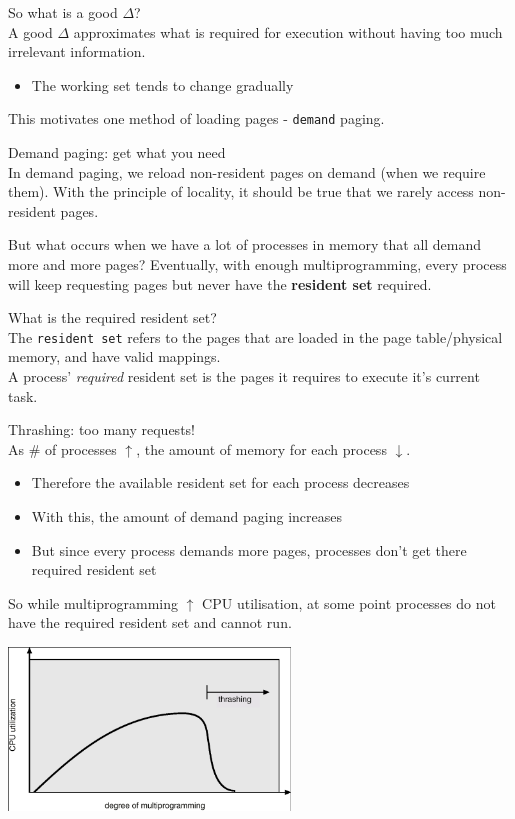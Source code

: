 \documentclass[journal, letterpaper]{IEEEtran}
\begin{document}
\begin{aside}{So what is a good $\Delta$?} \\
    A good $\Delta$ approximates what is required for execution without having too much irrelevant information.
    \begin{itemize}
        \item The working set tends to change gradually
    \end{itemize}
\end{aside}
This motivates one method of loading pages - \verb|demand| paging.
\begin{aside}{Demand paging: get what you need} \\
    In demand paging, we reload non-resident pages on demand (when we require them). With the principle of locality, it should be true that we rarely access non-resident pages.
\end{aside}
But what occurs when we have a lot of processes in memory that all demand more and more pages? Eventually, with enough multiprogramming, every process will keep requesting pages but never have the \textbf{resident set} required.
\begin{aside}{What is the required resident set?} \\
    The \verb|resident set| refers to the pages that are loaded in the page table/physical memory, and have valid mappings.
    \newline \\
    A process' \textit{required} resident set is the pages it requires to execute it's current task.
\end{aside}
\begin{theory}{Thrashing: too many requests!} \\
    As \# of processes $\uparrow$, the amount of memory for each process $\downarrow$.
    \begin{itemize}
        \item Therefore the available resident set for each process decreases
        \item With this, the amount of demand paging increases
        \item But since every process demands more pages, processes don't get there required resident set
    \end{itemize}
    So while multiprogramming $\uparrow$ CPU utilisation, at some point processes do not have the required resident set and cannot run.
    \begin{center}
        \includegraphics[width=7.5cm]{./photos/thrashing.png}
    \end{center}
\end{theory}
\end{document}
